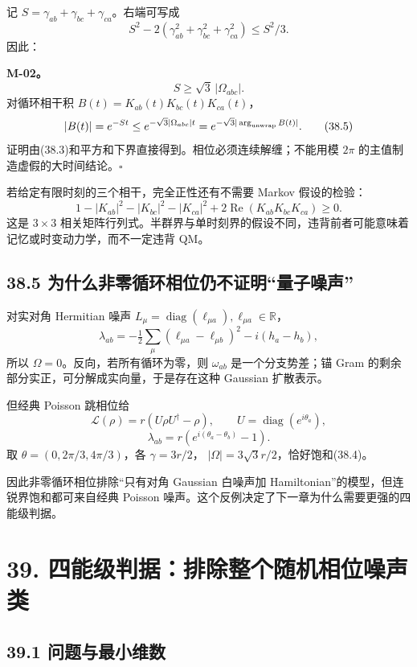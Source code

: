 \documentclass[
  11pt,
  oneside]{book}
\begin{document}
记 \(S=\gamma_{ab}+\gamma_{bc}+\gamma_{ca}\)。右端可写成 \[
S^2-2(\gamma_{ab}^2+\gamma_{bc}^2+\gamma_{ca}^2)\le S^2/3.
\] 因此：

\protect\hypertarget{m-02}{}{}

\textbf{M-02。} \[
S\ge\sqrt3\,|\Omega_{abc}|.
\tag{38.4}
\] 对循环相干积 \(B(t)=K_{ab}(t)K_{bc}(t)K_{ca}(t)\)， \[
|B(t)|=e^{-St}
\le e^{-\sqrt3|\Omega_{abc}|t}
=e^{-\sqrt3|\arg_{\rm unwrap} B(t)|}.
\tag{38.5}
\] 证明由(38.3)和平方和下界直接得到。相位必须连续解缠；不能用模 \(2\pi\)
的主值制造虚假的大时间结论。\(\square\)

若给定有限时刻的三个相干，完全正性还有不需要 Markov 假设的检验： \[
1-|K_{ab}|^2-|K_{bc}|^2-|K_{ca}|^2
+2\operatorname{Re}(K_{ab}K_{bc}K_{ca})\ge0.
\tag{38.6}
\] 这是 \(3\times3\)
相关矩阵行列式。半群界与单时刻界的假设不同，违背前者可能意味着记忆或时变动力学，而不一定违背
QM。

\hypertarget{ux4e3aux4ec0ux4e48ux975eux96f6ux5faaux73afux76f8ux4f4dux4ecdux4e0dux8bc1ux660eux91cfux5b50ux566aux58f0}{%
\section{38.5
为什么非零循环相位仍不证明``量子噪声''}\label{ux4e3aux4ec0ux4e48ux975eux96f6ux5faaux73afux76f8ux4f4dux4ecdux4e0dux8bc1ux660eux91cfux5b50ux566aux58f0}}

对实对角 Hermitian 噪声
\(L_\mu=\operatorname{diag}(\ell_{\mu a}),\ell_{\mu a}\in\mathbb R\)，
\[
\lambda_{ab}=-\tfrac12\sum_\mu(\ell_{\mu a}-\ell_{\mu b})^2
-i(h_a-h_b),
\] 所以 \(\Omega=0\)。反向，若所有循环为零，则 \(\omega_{ab}\)
是一个分支势差；锚 Gram 的剩余部分实正，可分解成实向量，于是存在这种
Gaussian 扩散表示。

但经典 Poisson 跳相位给 \[
\mathcal L(\rho)=r(U\rho U^\dagger-\rho),\qquad
U=\operatorname{diag}(e^{i\theta_a}),
\] \[
\lambda_{ab}=r(e^{i(\theta_a-\theta_b)}-1).
\tag{38.7}
\] 取 \(\theta=(0,2\pi/3,4\pi/3)\)，各 \(\gamma=3r/2\)，
\(|\Omega|=3\sqrt3r/2\)，恰好饱和(38.4)。

因此非零循环相位排除``只有对角 Gaussian 白噪声加
Hamiltonian''的模型，但连锐界饱和都可来自经典 Poisson
噪声。这个反例决定了下一章为什么需要更强的四能级判据。

\hypertarget{ch-39}{%
\chapter{39. 四能级判据：排除整个随机相位噪声类}\label{ch-39}}

\hypertarget{ux95eeux9898ux4e0eux6700ux5c0fux7ef4ux6570}{%
\section{39.1
问题与最小维数}\label{ux95eeux9898ux4e0eux6700ux5c0fux7ef4ux6570}}
\end{document}
